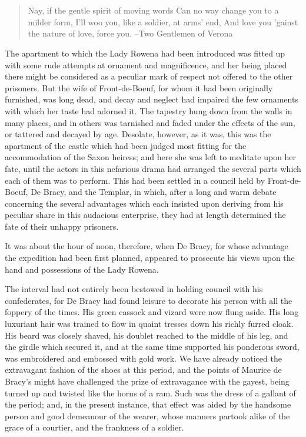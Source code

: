 \chapter{}

\begin{quote}
Nay, if the gentle spirit of moving words
Can no way change you to a milder form,
I'll woo you, like a soldier, at arms' end,
And love you 'gainst the nature of love, force you.
--Two Gentlemen of Verona
\end{quote}

The apartment to which the Lady Rowena had been introduced was fitted up
with some rude attempts at ornament and magnificence, and her being
placed there might be considered as a peculiar mark of respect not
offered to the other prisoners. But the wife of Front-de-Boeuf, for whom
it had been originally furnished, was long dead, and decay and neglect
had impaired the few ornaments with which her taste had adorned it. The
tapestry hung down from the walls in many places, and in others was
tarnished and faded under the effects of the sun, or tattered and
decayed by age. Desolate, however, as it was, this was the apartment of
the castle which had been judged most fitting for the accommodation of
the Saxon heiress; and here she was left to meditate upon her fate,
until the actors in this nefarious drama had arranged the several parts
which each of them was to perform. This had been settled in a council
held by Front-de-Boeuf, De Bracy, and the Templar, in which, after a
long and warm debate concerning the several advantages which each
insisted upon deriving from his peculiar share in this audacious
enterprise, they had at length determined the fate of their unhappy
prisoners.

It was about the hour of noon, therefore, when De Bracy, for whose
advantage the expedition had been first planned, appeared to prosecute
his views upon the hand and possessions of the Lady Rowena.

The interval had not entirely been bestowed in holding council with his
confederates, for De Bracy had found leisure to decorate his person with
all the foppery of the times. His green cassock and vizard were now
flung aside. His long luxuriant hair was trained to flow in quaint
tresses down his richly furred cloak. His beard was closely shaved, his
doublet reached to the middle of his leg, and the girdle which secured
it, and at the same time supported his ponderous sword, was embroidered
and embossed with gold work. We have already noticed the extravagant
fashion of the shoes at this period, and the points of Maurice de
Bracy's might have challenged the prize of extravagance with the gayest,
being turned up and twisted like the horns of a ram. Such was the dress
of a gallant of the period; and, in the present instance, that effect
was aided by the handsome person and good demeanour of the wearer, whose
manners partook alike of the grace of a courtier, and the frankness of a
soldier.

